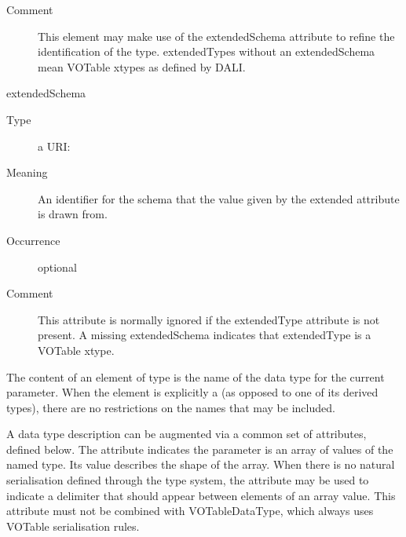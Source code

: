 \documentclass[11pt,a4paper]{ivoa}
\begin{document}
\begin{generated}
\begin{bigdescription}
\begin{description}
\item[Comment] 
                     This element may make use of the extendedSchema
                     attribute to refine the identification of the 
                     type.  extendedTypes without an extendedSchema 
                     mean VOTable xtypes as defined by DALI.
                  
\end{description}
\item[extendedSchema]
\begin{description}
\item[Type] a URI: 
\item[Meaning] 
                     An identifier for the schema that the value given
                     by the extended attribute is drawn from.
                  
\item[Occurrence] optional
\item[Comment] 
                     This attribute is normally ignored if the
                     extendedType attribute is not present.  A missing
                     extendedSchema indicates that extendedType is a
                     VOTable xtype.
                  
\end{description}


\end{bigdescription}\endgroup

\endgroup
\end{generated}


The content of an element of type  is the name
of the data type for the current parameter.  When the element is explicitly
a  (as opposed to one of its derived types),
there are no restrictions on the names that may be included.  



A data type description can be augmented via a common set of
 attributes, defined below.  The
 attribute indicates the parameter is an array
of values of the named type.  Its value describes the shape of the
array. When there is no natural serialisation defined through the type
system, the  attribute may be used to indicate
a delimiter that should appear between elements of an array value.  This
attribute must not be combined with VOTableDataType, which always
uses VOTable serialisation rules.
\end{document}
